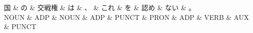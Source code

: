 \documentclass[tikz,border=5pt]{standalone}
\begin{document}
\normalsize
\begin{dependency}[edge unit distance=12.0pt]
    \begin{deptext}[column sep=1em]
        国 \& の \& 交戦権 \& は \& 、 \& これ \& を \& 認め \& ない \& 。\\
        NOUN \& ADP \& NOUN \& ADP \& PUNCT \& PRON \& ADP \& VERB \& AUX \& PUNCT\\
    \end{deptext}
\end{dependency}
\end{document}
